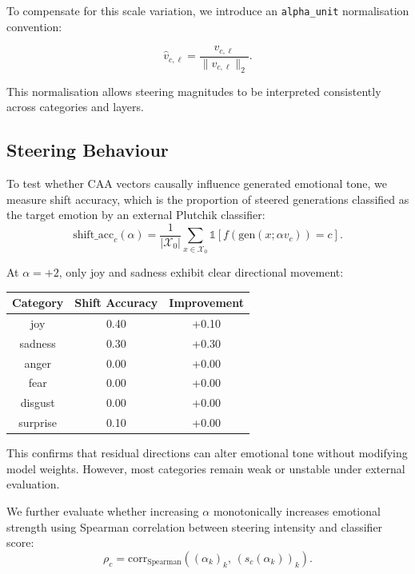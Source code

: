 \documentclass[12pt,twoside]{report}
\begin{document}
To compensate for this scale variation, we introduce an \texttt{alpha\_unit} normalisation convention:

\begin{equation}
\hat v_{c,\ell}
=
\frac{v_{c,\ell}}{\|v_{c,\ell}\|_2}.
\end{equation}

This normalisation allows steering magnitudes to be interpreted consistently across categories and layers.

\subsection{Steering Behaviour}
\label{sec:emotion_code:caa:steering}

To test whether CAA vectors causally influence generated emotional tone, we measure shift accuracy, which is the proportion of steered generations classified as the target emotion by an external Plutchik classifier:
\begin{equation}
\mathrm{shift\_acc}_c(\alpha)
=
\frac{1}{|\mathcal{X}_0|}
\sum_{x\in\mathcal{X}_0}
\mathbb{1}
\left[
f(\mathrm{gen}(x;\alpha v_c)) = c
\right].
\end{equation}

At $\alpha=+2$, only joy and sadness exhibit clear directional movement:
\begin{center}
\begin{tabular}{c|c|c}
Category & Shift Accuracy & Improvement \\
\hline
joy & 0.40 & +0.10 \\
sadness & 0.30 & +0.30 \\
anger & 0.00 & +0.00 \\
fear & 0.00 & +0.00 \\
disgust & 0.00 & +0.00 \\
surprise & 0.10 & +0.00
\end{tabular}
\end{center}

This confirms that residual directions
can alter emotional tone without modifying model weights. However, most categories remain weak or unstable under external evaluation.

We further evaluate whether increasing $\alpha$ monotonically increases emotional strength using Spearman correlation between steering intensity and classifier score:
\begin{equation}
\rho_c
=
\mathrm{corr}_{\mathrm{Spearman}}
\left(
(\alpha_k)_k,\,
(s_c(\alpha_k))_k
\right).
\end{equation}
\end{document}
